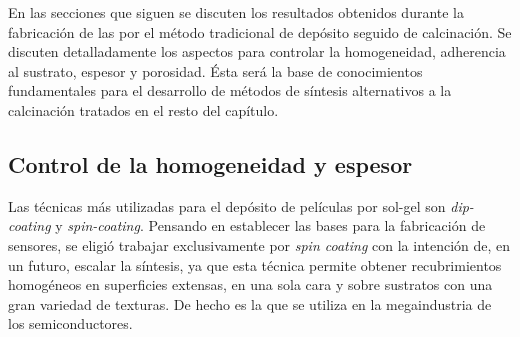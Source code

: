 		En las secciones que siguen se discuten los resultados obtenidos durante la fabricación de las \pdm\space por el método tradicional de depósito seguido de calcinación. Se discuten detalladamente los aspectos para controlar la homogeneidad, adherencia al sustrato, espesor y porosidad. Ésta será la base de conocimientos fundamentales para el desarrollo de métodos de síntesis alternativos a la calcinación tratados en el resto del capítulo.

		\subsection{Control de la homogeneidad y espesor}
		
		Las técnicas más utilizadas para el depósito de películas por sol-gel son \textit{dip-coating} y \textit{spin-coating}. 
		Pensando en establecer las bases para la fabricación de sensores, se eligió trabajar exclusivamente por \textit{spin coating} con la intención de, en un futuro, escalar la síntesis, ya que esta técnica permite obtener recubrimientos homogéneos en superficies extensas, en una sola cara y sobre sustratos con una gran variedad de texturas. De hecho es la que se utiliza en la megaindustria de los semiconductores.\cite{Franssila2004,Jaeger2001} 		

